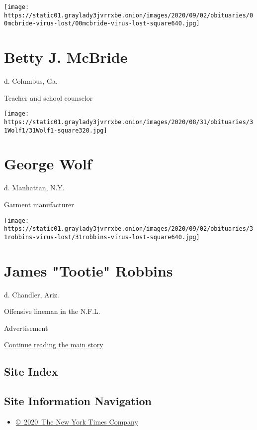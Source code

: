 \texttt{[image: https://static01.graylady3jvrrxbe.onion/images/2020/09/02/obituaries/00mcbride-virus-lost/00mcbride-virus-lost-square640.jpg]}

\hypertarget{betty-j-mcbride}{%
\section{Betty J. McBride}\label{betty-j-mcbride}}

d. Columbus, Ga.

Teacher and school counselor

\texttt{[image: https://static01.graylady3jvrrxbe.onion/images/2020/08/31/obituaries/31Wolf1/31Wolf1-square320.jpg]}

\hypertarget{george-wolf}{%
\section{George Wolf}\label{george-wolf}}

d. Manhattan, N.Y.

Garment manufacturer

\texttt{[image: https://static01.graylady3jvrrxbe.onion/images/2020/09/02/obituaries/31robbins-virus-lost/31robbins-virus-lost-square640.jpg]}

\hypertarget{james-tootie-robbins}{%
\section{James "Tootie" Robbins}\label{james-tootie-robbins}}

d. Chandler, Ariz.

Offensive lineman in the N.F.L.

Advertisement

\protect\hyperlink{after-bottom}{Continue reading the main story}

\hypertarget{site-index}{%
\subsection{Site Index}\label{site-index}}

\hypertarget{site-information-navigation}{%
\subsection{Site Information
Navigation}\label{site-information-navigation}}

\begin{itemize}
\tightlist
\item
  \href{https://help.nytimes3xbfgragh.onion/hc/en-us/articles/115014792127-Copyright-notice}{©~2020~The
  New York Times Company}
\end{itemize}

